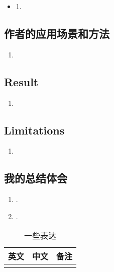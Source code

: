 \documentclass{readarticle}
\begin{document}
    
    \begin{itemize}
        \item 1. 
    \end{itemize}


\subsection{作者的应用场景和方法}

    \begin{enumerate}[1.]
        \item  
    \end{enumerate}

\subsection{Result}
    \begin{enumerate}[1.]
        \item  
    \end{enumerate}

\subsection{Limitations}
    \begin{enumerate}[(1)]
        \item  
    \end{enumerate}


\subsection{我的总结体会}


\begin{enumerate}
    \item .
    \item .

\end{enumerate}
\begin{table}[htbp]
    \centering
    \small
    \caption{一些表达}
    \begin{tabular}{lll}
        \toprule
        英文 &中文 &备注\\
        \midrule
        & & \\
        \bottomrule
    \end{tabular}%
    \label{tab:n.keywords}%
\end{table}%
\end{document}

